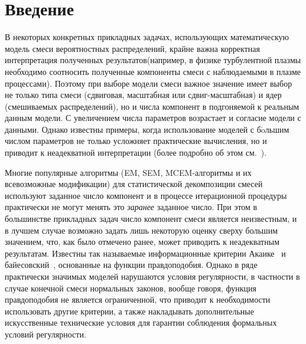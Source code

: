 
\vspace*{4pt}


      \thispagestyle{headings}

      \begin{multicols}{2}
      
            \label{st\stat}




\section{Введение}

В некоторых конкретных прикладных задачах, использующих
математическую модель смеси ве\-роятностных распределений, крайне
важна кор\-ректная интерпретация полученных результатов\linebreak (например, в
физике турбулентной плазмы необходимо соотносить полученные
компоненты смеси с наблюдаемыми в плазме процессами). Поэтому при
выборе модели смеси важное значение имеет выбор не только типа
смеси (сдвиговая, масштабная или сдвиг-масштабная) и ядер
(смешиваемых распределений), но и числа компонент в подгоняемой к
реальным данным модели. С увеличением числа параметров возрастает
и согласие модели с данными. Однако известны примеры, когда
использование моделей с б$\acute{\mbox{o}}$льшим числом параметров не только
усложняет практические вычисления, но и приводит к неадекватной
интерпретации (более подробно об этом см.~\cite{Korolev2007, Korolev2010}).

Многие популярные алгоритмы (EM, SEM, MCEM-ал\-го\-рит\-мы и их
всевозможные модификации) для статистической декомпозиции смесей
используют заданное число компонент и в процессе итерационной
процедуры практически не могут менять это \textit{заранее} заданное
число. При этом в большинстве прикладных задач число компонент смеси
является неизвестным, и в лучшем случае возможно задать лишь
некоторую оценку сверху большим значением, что, как было
отмечено ранее, может приводить к неадекватным результатам. Известны
так называемые информационные критерии Акаике~\cite{Akaike1973} и
байесовский~\cite{Schwartz1978}, основанные на функции
правдоподобия. Однако в ряде практически значимых моделей нарушаются
условия регулярности, в частности в случае конечной смеси
нормальных законов, вообще говоря, функция правдоподобия не является
ограниченной, что приводит к необходимости использовать другие
критерии, а также накладывать дополнительные искусственные
технические условия для гарантии соблюдения формальных условий
регулярности.


\end{multicols}
